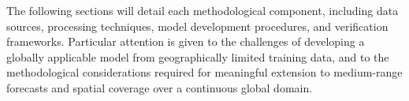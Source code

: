 The following sections will detail each methodological component, including data sources, processing techniques, model development procedures, and verification frameworks. Particular attention is given to the challenges of developing a globally applicable model from geographically limited training data, and to the methodological considerations required for meaningful extension to medium-range forecasts and spatial coverage over a continuous global domain.


